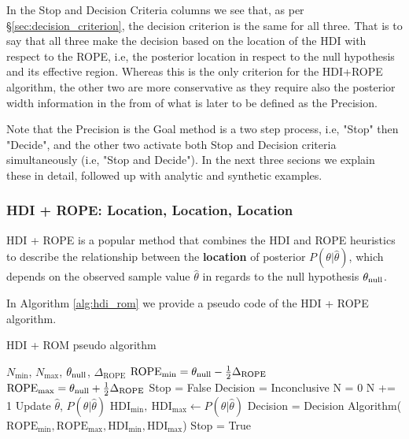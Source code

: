In the Stop and Decision Criteria columns we see that,
as per \S\ref{sec:decision_criterion}, the decision criterion is the same
for all three. That is to say that all three make the decision based on the
location of the HDI with respect to the ROPE, i.e, the posterior location in respect
to the null hypothesis and its effective region.
Whereas this is the only criterion for the HDI+ROPE algorithm, the other two
are more conservative as they require also the posterior width information in the from
of what is later to be defined as the Precision.


Note that the Precision is the Goal method is a two step process, 
i.e, "Stop" then "Decide",
and the other two activate both Stop and Decision criteria simultaneously
(i.e, "Stop and Decide"). In the next three secions we explain these in detail,
followed up with analytic and synthetic examples.


\subsubsection{HDI + ROPE: Location, Location, Location}

HDI + ROPE is a popular method that combines the HDI and ROPE heuristics to describe
the relationship between the \textbf{location} of posterior $P(\theta|\hat\theta)$, which depends on the observed
sample value $\hat\theta$ in regards to the
null hypothesis $\theta_{\rm null}$.

In Algorithm \ref{alg:hdi_rom} we provide a pseudo code of the HDI + ROPE algorithm.



\begin{algorithm}
    \caption{HDI + ROM pseudo algorithm}\label{alg:hdi_rom}
    \begin{algorithmic}
    \Require $N_\mathrm{min}$, $N_\mathrm{max}$, $\theta_{\rm null}$, $\Delta_\mathrm{ROPE}$
    \State $\mathrm{ROPE}_\mathrm{min} = \theta_{\rm null} - \frac{1}{2}\Delta_\mathrm{ROPE}$
    \State $\mathrm{ROPE}_\mathrm{max} = \theta_{\rm null} + \frac{1}{2}\Delta_\mathrm{ROPE}$
    \State Stop = False
    \State Decision = Inconclusive
    \State N = 0
    \State N += 1  
    \State Update $\hat\theta$, $P(\theta|\hat\theta)$  
    \State $\mathrm{HDI}_\mathrm{min}, \ \mathrm{HDI}_\mathrm{max}  \gets P(\theta|\hat\theta)$
        \State Decision = Decision Algorithm($\mathrm{ROPE}_\mathrm{min}, \mathrm{ROPE}_\mathrm{max}, \mathrm{HDI}_\mathrm{min}, \mathrm{HDI}_\mathrm{max}$)
            \State \HiLi Stop = True  
        \EndIf
    \EndIf
    \EndWhile
    \end{algorithmic}
\end{algorithm}


